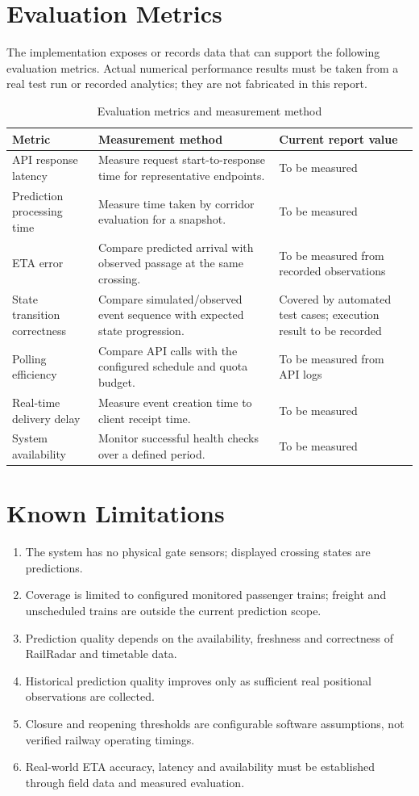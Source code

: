 \documentclass[11pt,a4paper]{report}
\begin{document}
\section{Evaluation Metrics}
The implementation exposes or records data that can support the following evaluation metrics. Actual numerical performance results must be taken from a real test run or recorded analytics; they are not fabricated in this report.

\begin{table}[H]\centering
\caption{Evaluation metrics and measurement method}
\label{tab:metrics}
\begin{tabularx}{\textwidth}{p{3.0cm}X p{3.5cm}}
\toprule
\textbf{Metric} & \textbf{Measurement method} & \textbf{Current report value}\\
\midrule
API response latency & Measure request start-to-response time for representative endpoints. & To be measured\\
Prediction processing time & Measure time taken by corridor evaluation for a snapshot. & To be measured\\
ETA error & Compare predicted arrival with observed passage at the same crossing. & To be measured from recorded observations\\
State transition correctness & Compare simulated/observed event sequence with expected state progression. & Covered by automated test cases; execution result to be recorded\\
Polling efficiency & Compare API calls with the configured schedule and quota budget. & To be measured from API logs\\
Real-time delivery delay & Measure event creation time to client receipt time. & To be measured\\
System availability & Monitor successful health checks over a defined period. & To be measured\\
\bottomrule
\end{tabularx}
\end{table}

\section{Known Limitations}
\begin{enumerate}
  \item The system has no physical gate sensors; displayed crossing states are predictions.
  \item Coverage is limited to configured monitored passenger trains; freight and unscheduled trains are outside the current prediction scope.
  \item Prediction quality depends on the availability, freshness and correctness of RailRadar and timetable data.
  \item Historical prediction quality improves only as sufficient real positional observations are collected.
  \item Closure and reopening thresholds are configurable software assumptions, not verified railway operating timings.
  \item Real-world ETA accuracy, latency and availability must be established through field data and measured evaluation.
\end{enumerate}
\end{document}
